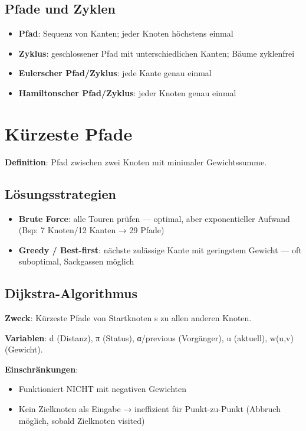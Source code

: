 \documentclass[11pt, a4paper]{article}
\begin{document}
\subsection{Pfade und Zyklen}

\begin{itemize}
  \item \textbf{Pfad}: Sequenz von Kanten; jeder Knoten höchstens einmal
  \item \textbf{Zyklus}: geschlossener Pfad mit unterschiedlichen Kanten; Bäume zyklenfrei
  \item \textbf{Eulerscher Pfad/Zyklus}: jede Kante genau einmal
  \item \textbf{Hamiltonscher Pfad/Zyklus}: jeder Knoten genau einmal
\end{itemize}


\section{Kürzeste Pfade}

\textbf{Definition}: Pfad zwischen zwei Knoten mit minimaler Gewichtssumme.



\subsection{Lösungsstrategien}

\begin{itemize}
  \item \textbf{Brute Force}: alle Touren prüfen — optimal, aber exponentieller Aufwand (Bsp: 7 Knoten/12 Kanten → 29 Pfade)
  \item \textbf{Greedy / Best-first}: nächste zulässige Kante mit geringstem Gewicht — oft suboptimal, Sackgassen möglich
\end{itemize}


\subsection{Dijkstra-Algorithmus}

\textbf{Zweck}: Kürzeste Pfade von Startknoten s zu allen anderen Knoten.


\textbf{Variablen}: d (Distanz), π (Status), α/previous (Vorgänger), u (aktuell), w(u,v) (Gewicht).


\textbf{Einschränkungen}:

\begin{itemize}
  \item Funktioniert NICHT mit negativen Gewichten
  \item Kein Zielknoten als Eingabe → ineffizient für Punkt-zu-Punkt (Abbruch möglich, sobald Zielknoten visited)
\end{itemize}
\end{document}
